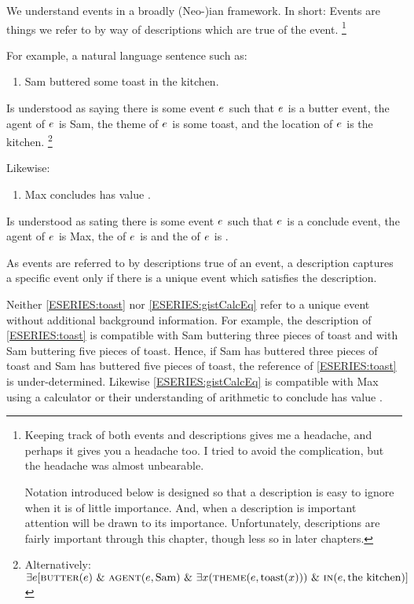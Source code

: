 \begin{note}
  We understand events in a broadly (Neo-)\citeauthor{Davidson:1967aa}ian framework.
  In short:
  Events are things we refer to by way of descriptions which are true of the event.%
    \footnote{
      Keeping track of both events and descriptions gives me a headache, and perhaps it gives you a headache too.
      I tried to avoid the complication, but the headache was almost unbearable.

      Notation introduced below is designed so that a description is easy to ignore when it is of little importance.
      And, when a description is important attention will be drawn to its importance.
      Unfortunately, descriptions are fairly important through this chapter, though less so in later chapters.
    }

  For example, a natural language sentence such as:
  \begin{enumerate}[label=\arabic*., ref=(\arabic*), series=ESERIES]
  \item
    \label{ESERIES:toast}
    Sam buttered some toast in the kitchen.
  \end{enumerate}
  Is understood as saying there is some event \(e\sb{}\) such that \(e\sb{}\) is a butter event, the agent of \(e\sb{}\) is Sam, the theme of \(e\sb{}\) is some toast, and the location of \(e\sb{}\) is the kitchen.%
  \footnote{
    Alternatively:
    \(\exists e [\textsc{butter}(e)\text{ \& }\textsc{agent}(e, \text{Sam})\text{ \& }\exists x(\textsc{theme}(e, \text{toast}(x)))\text{ \& }\textsc{in}(e, \text{the kitchen})]\)
  }

  Likewise:
  \begin{enumerate}[label=\arabic*., ref=(\arabic*), resume*=ESERIES]
  \item
    \label{ESERIES:gistCalcEq}
    Max concludes \gistCalcEq{} has value .
  \end{enumerate}
  Is understood as sating there is some event \(e\sb{}\) such that \(e\sb{}\) is a conclude event, the agent of \(e\sb{}\) is Max, the  of \(e\sb{}\) is \gistCalcEq{} and the \val{} of \(e\sb{}\) is .

  As events are referred to by descriptions true of an event, a description captures a specific event only if there is a unique event which satisfies the description.

  Neither \ref{ESERIES:toast} nor \ref{ESERIES:gistCalcEq} refer to a unique event without additional background information.
  For example, the description of \ref{ESERIES:toast} is compatible with Sam buttering three pieces of toast and with Sam buttering five pieces of toast.
  Hence, if Sam has buttered three pieces of toast and Sam has buttered five pieces of toast, the reference of \ref{ESERIES:toast} is under-determined.
  Likewise \ref{ESERIES:gistCalcEq} is compatible with Max using a calculator or their understanding of arithmetic to conclude \gistCalcEq{} has value .


\end{note}
